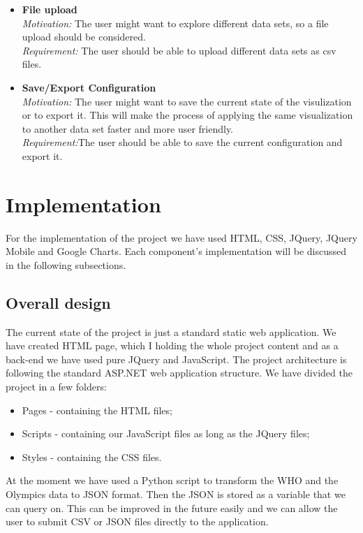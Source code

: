 \documentclass[a4paper]{article}
\begin{document}
\begin{itemize}
\item[\checkmark]{\textbf{File upload}
\\\textit{Motivation:} The user might want to explore different data sets, so a file upload should be considered.
\\\textit{Requirement:} The user should be able to upload different data sets as csv files.
}

\item[\checkmark]{\textbf{Save/Export Configuration}
\\\textit{Motivation:} The user might want to save the current state of the visulization or to export it. This will make the process of applying the same visualization to another data set faster and more user friendly.
\\\textit{Requirement:}The user should be able to save the current configuration and export it.
}

\end{itemize}



\section{Implementation}
For the implementation of the project we have used HTML, CSS, JQuery, JQuery Mobile and Google Charts. Each component’s implementation will be discussed in the following subsections.

\subsection{Overall design}
The current state of the project is just a standard static web application. We have created HTML page, which I holding the whole project content and as a back-end we have used pure JQuery and JavaScript. The project architecture is following the standard ASP.NET web application structure. We have divided the project in a few folders:
\begin{itemize}
\item{Pages - containing the HTML files;}
\item{Scripts - containing our JavaScript files as long as the JQuery files;}
\item{Styles - containing the CSS files.}
\end{itemize}

At the moment we have used a Python script to transform the WHO and the Olympics data to JSON format. Then the JSON is stored as a variable that we can query on. This can be improved in the future easily and we can allow the user to submit CSV or JSON files directly to the application. 
\end{document}

